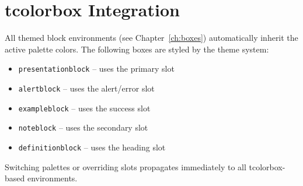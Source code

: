 \section{tcolorbox Integration}

All themed block environments (see Chapter~\ref{ch:boxes}) automatically
inherit the active palette colors.  The following boxes are styled by the
theme system:

\begin{itemize}
  \item \texttt{presentationblock} -- uses the primary slot
  \item \texttt{alertblock}        -- uses the alert/error slot
  \item \texttt{exampleblock}      -- uses the success slot
  \item \texttt{noteblock}         -- uses the secondary slot
  \item \texttt{definitionblock}   -- uses the heading slot
\end{itemize}

Switching palettes or overriding slots propagates immediately to all
tcolorbox-based environments.
